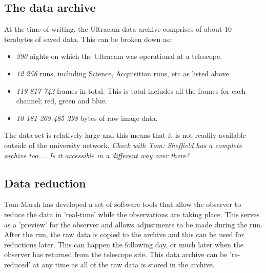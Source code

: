 \documentclass[a4paper,10pt]{article}
\begin{document}
\subsection{The data archive}
At the time of writing, the Ultracam data archive comprises of about 10 terabytes of saved data. This can be broken down as:
\begin{itemize}
	\item \emph{390} nights on which the Ultracam was operational at a telescope.
	\item \emph{12 256} runs, including Science, Acquisition runs, etc as listed above. 
	\item \emph{119 817 742} frames in total. This is total includes all the frames for each channel; red, green and blue.
	\item \emph{10 181 269 485 298} bytes of raw image data.
\end{itemize} 
The data set is relatively large and this means that it is not readily available outside of the university network. \emph{Check with Tom: Sheffield has a complete archive too.... Is it accessible in a different way over there?} 

\subsection{Data reduction}
Tom Marsh has developed a set of software tools that allow the observer to reduce the data in 'real-time' while the observations are taking place. This serves as a 'preview' for the observer and allows adjustments to be made during the run. After the run, the raw data is copied to the archive and this can be used for reductions later. This can happen the following day, or much later when the observer has returned from the telescope site. This data archive can be 're-reduced' at any time as all of the raw data is stored in the archive. 
\end{document}
